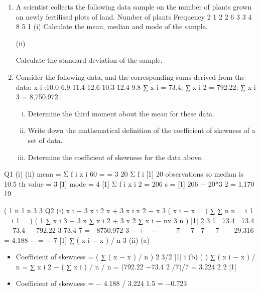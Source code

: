 \documentclass[a4paper,12pt]{article}
\begin{document}
\begin{enumerate}

\item A scientist collects the following data sample on the number of plants grown on
newly fertilised plots of land.
Number of plants Frequency
2
1 2
2 6
3 3
4 8
5 1
(i) Calculate the mean, median and mode of the sample.

(ii)

 Calculate the standard deviation of the sample.

\item 
Consider the following data, and the corresponding sums derived from the data:
x i :10.0 6.9 11.4 12.6 10.3 12.4 9.8
∑ x i = 73.4; ∑ x i 2 = 792.22; ∑ x i 3 = 8,750.972.
\begin{enumerate}[(i)]
\item Determine the third moment about the mean for these data.
\item Write down the mathematical definition of the coefficient of skewness
of a set of data.
\item Determine the coefficient of skewness for the data above. 
\end{enumerate}


\end{enumerate}
\newpage

Q1
(i)
(ii)
mean
=
Σ f i x i 60
= = 3
20
Σ f i
[1]
20 observations so median is 10.5 th value = 3 [1]
mode = 4 [1]
Σ f i x i 2 =
206
s
=
[1]
206 − 20*3 2
= 1.170
19

(
1 n
1 n 3
3
\newpage
Q2 (i)
x i − 3 x i 2 x + 3 x i x 2 − x 3
( x i − x =
)
∑
∑
n
n
= i 1 = i 1
=
)
(
1
∑ x i 3 − 3 x ∑ x i 2 + 3 x 2 ∑ x i − nx 3
n
)
[1]
2
3
1 
73.4
 73.4 
 73.4  
792.22  3
73.4
7
=  8750.972  3
−
+ 
−


 
7  
7
 7 
 7   
29.316
=
    4.188    
−
=
−
7
[1]
∑ ( x i − x ) / n
3
(ii)
(a)
\begin{itemize}
    \item Coefficient of skewness =
( ∑ ( x − x ) / n )
2
3/2
[1]
i
(b)
(
)
∑ ( x i − x ) / n = ∑ x i 2 − ( ∑ x i ) / n / n = (792.22 −73.4 2 /7)/7 = 3.224
2
2
[1]
\item Coefficient of skewness = − 4.188 / 3.224 1.5 = −0.723
\end{itemize}



\end{document}
